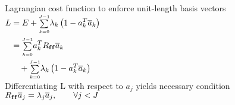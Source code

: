\begin{compactdesc}
\begin{enumerate*}[label=\protect\circled{\arabic*},itemjoin=]
		\item Lagrangian cost function to enforce unit-length basis vectors\\
			$
			\begin{aligned}
				L&=E+{\scriptstyle\sum\limits_{k=0}^{J-1}}\lambda_k\left( 1-a_{k}^{T}\overline{a}_k \right)\\
				&={\scriptstyle\sum\limits_{k=0}^{J-1}}a_{k}^{T}R_{\bm{\mathrm{f}}\bm{\mathrm{f}}}\overline{a}_k\\
				&\quad+{\scriptstyle\sum\limits_{k=0}^{J-1}}\lambda_k\left( 1-a_{k}^{T}\overline{a}_{k} \right)
			\end{aligned}
			$\\
			Differentiating L with respect to $a_j$ yields necessary condition\\
				$R_{\bm{\mathrm{f}}\bm{\mathrm{f}}}\overline{a}_{j}=\lambda_j\overline{a}_j,\qquad \forall j<J$\\
		\end{enumerate*}

\end{compactdesc}
